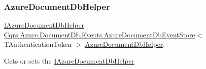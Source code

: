 \subsubsection{\texorpdfstring{Azure\+Document\+Db\+Helper}{AzureDocumentDbHelper}}
{\footnotesize\ttfamily \hyperlink{interfaceCqrs_1_1Azure_1_1DocumentDb_1_1IAzureDocumentDbHelper}{I\+Azure\+Document\+Db\+Helper} \hyperlink{classCqrs_1_1Azure_1_1DocumentDb_1_1Events_1_1AzureDocumentDbEventStore}{Cqrs.\+Azure.\+Document\+Db.\+Events.\+Azure\+Document\+Db\+Event\+Store}$<$ T\+Authentication\+Token $>$.\hyperlink{classCqrs_1_1Azure_1_1DocumentDb_1_1AzureDocumentDbHelper}{Azure\+Document\+Db\+Helper}\hspace{0.3cm}{\ttfamily [get]}, {\ttfamily [protected]}}



Gets or sets the \hyperlink{interfaceCqrs_1_1Azure_1_1DocumentDb_1_1IAzureDocumentDbHelper}{I\+Azure\+Document\+Db\+Helper} 

